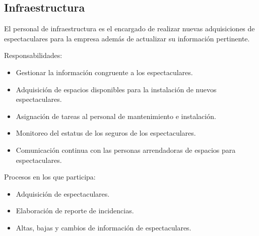 \begin{Usuario}{\subsection{Infraestructura}}{
	El personal de infraestructura es el encargado de realizar nuevas adquisiciones de espectaculares para la empresa además de actualizar su información pertinente.\\
}
    \item[Responsabilidades:] \cdtEmpty
    \begin{itemize}
        \item Gestionar la información congruente a los espectaculares.
		\item Adquisición de espacios disponibles para la instalación de nuevos espectaculares.
		\item Asignación de tareas al personal de mantenimiento e instalación.
		\item Monitoreo del estatus de los seguros de los espectaculares.
		\item Comunicación continua con las personas arrendadoras de espacios para espectaculares.
	\end{itemize}

	\item[Procesos en los que participa:] \cdtEmpty
    \begin{itemize}
		\item Adquisición de espectaculares.
		\item Elaboración de reporte de incidencias.
		\item Altas, bajas y cambios de información de espectaculares.
    \end{itemize}
\end{Usuario}


